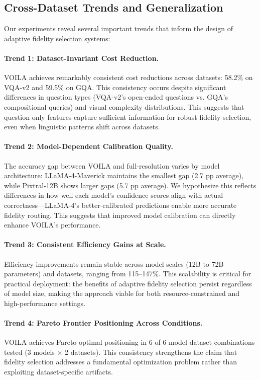 \subsection{Cross-Dataset Trends and Generalization}
\label{sec:trends}

Our experiments reveal several important trends that inform the design of adaptive fidelity selection systems:

\paragraph{Trend 1: Dataset-Invariant Cost Reduction.} VOILA achieves remarkably consistent cost reductions across datasets: 58.2\% on VQA-v2 and 59.5\% on GQA. This consistency occurs despite significant differences in question types (VQA-v2's open-ended questions vs. GQA's compositional queries) and visual complexity distributions. This suggests that question-only features capture sufficient information for robust fidelity selection, even when linguistic patterns shift across datasets.

\paragraph{Trend 2: Model-Dependent Calibration Quality.} The accuracy gap between VOILA and full-resolution varies by model architecture: LLaMA-4-Maverick maintains the smallest gap (2.7 pp average), while Pixtral-12B shows larger gaps (5.7 pp average). We hypothesize this reflects differences in how well each model's confidence scores align with actual correctness---LLaMA-4's better-calibrated predictions enable more accurate fidelity routing. This suggests that improved model calibration can directly enhance VOILA's performance.

\paragraph{Trend 3: Consistent Efficiency Gains at Scale.} Efficiency improvements remain stable across model scales (12B to 72B parameters) and datasets, ranging from 115--147\%. This scalability is critical for practical deployment: the benefits of adaptive fidelity selection persist regardless of model size, making the approach viable for both resource-constrained and high-performance settings.

\paragraph{Trend 4: Pareto Frontier Positioning Across Conditions.} VOILA achieves Pareto-optimal positioning in 6 of 6 model-dataset combinations tested (3 models $\times$ 2 datasets). This consistency strengthens the claim that fidelity selection addresses a fundamental optimization problem rather than exploiting dataset-specific artifacts.

